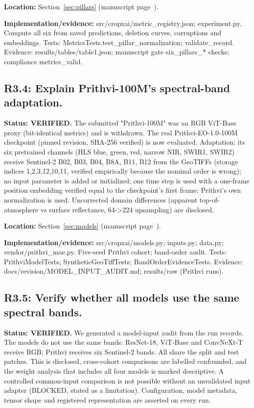 \documentclass[3p,times,procedia]{elsarticle}
\begin{document}
\par\textbf{Location:} Section~\ref{sec:pillars} (manuscript page~\pageref{sec:pillars}).

\par\textbf{Implementation/evidence:} src/cropxai/metric\_registry.json; experiment.py. Compute all six from saved predictions, deletion curves, corruptions and embeddings. Tests: MetricsTests.test\_pillar\_normalization; validate\_record. Evidence: results/tables/table1.json; manuscript gate six\_pillars\_* checks; compliance metrics\_valid.

\subsection*{R3.4: Explain Prithvi-100M's spectral-band adaptation.}

\textbf{Status: VERIFIED.} The submitted "Prithvi-100M" was an RGB ViT-Base proxy (bit-identical metrics) and is withdrawn. The real Prithvi-EO-1.0-100M checkpoint (pinned revision, SHA-256 verified) is now evaluated. Adaptation: its six pretrained channels (HLS blue, green, red, narrow NIR, SWIR1, SWIR2) receive Sentinel-2 B02, B03, B04, B8A, B11, B12 from the GeoTIFFs (storage indices 1,2,3,12,10,11, verified empirically because the nominal order is wrong); no input parameter is added or initialized; one time step is used with a one-frame position embedding verified equal to the checkpoint's first frame; Prithvi's own normalization is used. Uncorrected domain differences (apparent top-of-atmosphere vs surface reflectance, 64->224 upsampling) are disclosed.

\par\textbf{Location:} Section~\ref{sec:models} (manuscript page~\pageref{sec:models}).

\par\textbf{Implementation/evidence:} src/cropxai/models.py; inputs.py; data.py; vendor/prithvi\_mae.py. Five-seed Prithvi cohort; band-order audit. Tests: PrithviModelTests; SyntheticGeoTiffTests; BandOrderEvidenceTests. Evidence: docs/revision/MODEL\_INPUT\_AUDIT.md; results/raw (Prithvi runs).

\subsection*{R3.5: Verify whether all models use the same spectral bands.}

\textbf{Status: VERIFIED.} We generated a model-input audit from the run records. The models do not use the same bands: ResNet-18, ViT-Base and ConvNeXt-T receive RGB; Prithvi receives six Sentinel-2 bands. All share the split and test patches. This is disclosed, cross-cohort comparisons are labelled confounded, and the weight analysis that includes all four models is marked descriptive. A controlled common-input comparison is not possible without an unvalidated input adapter (BLOCKED, stated as a limitation). Configuration, model metadata, tensor shape and registered representation are asserted on every run.
\end{document}
